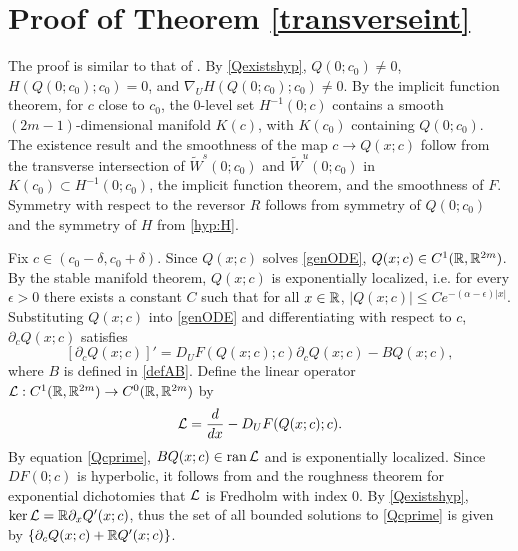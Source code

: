 \documentclass[10pt,reqno]{amsart}
\theoremstyle{plain}
\theoremstyle{definition}
\theoremstyle{remark}
\numberwithin{theorem}{section}
\numberwithin{equation}{section}
\begin{document}
\section{Proof of Theorem \ref{transverseint}}\label{sec:transverseintproof}

The proof is similar to that of \cite{Kapitula2020}. By \cref{Qexistshyp}, $Q(0; c_0) \neq 0$, $H(Q(0; c_0); c_0) = 0$, and $\nabla_U H(Q(0; c_0); c_0) \neq 0$. By the implicit function theorem, for $c$ close to $c_0$, the 0-level set $H^{-1}(0; c)$ contains a smooth $(2m-1)$-dimensional manifold $K(c)$, with $K(c_0)$ containing $Q(0; c_0)$. The existence result and the smoothness of the map $c \rightarrow Q(x; c)$ follow from the transverse intersection of $\tilde{W}^s(0; c_0)$ and $\tilde{W}^u(0; c_0)$ in $K(c_0) \subset H^{-1}(0; c_0)$, the implicit function theorem, and the smoothness of $F$. Symmetry with respect to the reversor $R$ follows from symmetry of $Q(0; c_0)$ and the symmetry of $H$ from \cref{hyp:H}.

Fix $c \in (c_0 - \delta, c_0 + \delta)$. Since $Q(x; c)$ solves \ref{genODE}, $Q(x; c) \in C^1(\mathbb{R}, \mathbb{R}^{2m})$. By the stable manifold theorem, $Q(x; c)$ is exponentially localized, i.e. for every $\epsilon > 0$ there exists a constant $C$ such that for all $x \in \mathbb{R}$, $|Q(x; c)| \leq C e^{-(\alpha - \epsilon)|x|}$. Substituting $Q(x; c)$ into \cref{genODE} and differentiating with respect to $c$, $\partial_c Q(x; c)$ satisfies
\begin{equation}\label{Qcprime}
[\partial_c Q(x; c)]' = D_U F(Q(x;c); c) \partial_c Q(x; c) - B Q(x;c),
\end{equation}
where $B$ is defined in \cref{defAB}. Define the linear operator $\mathcal{L}: C^1(\mathbb{R}, \mathbb{R}^{2m}) \rightarrow C^0(\mathbb{R}, \mathbb{R}^{2m})$ by
\begin{equation}\label{defLtv}
\mathcal{L} = \frac{d}{dx} - D_U F(Q(x;c); c).
\end{equation}
By equation \cref{Qcprime}, $B Q(x;c) \in \operatorname{ran} \mathcal{L}$ and is exponentially localized. Since $DF(0; c)$ is hyperbolic, it follows from \cite[Lemma~4.2]{Palmer1984} and the roughness theorem for exponential dichotomies \cite{Coppel1978} that $\mathcal{L}$ is Fredholm with index 0. By \cref{Qexistshyp}, $\mathop\mathrm{ker}\nolimits \mathcal{L} = \mathbb{R} \partial_x Q'(x; c)$, thus the set of all bounded solutions to \cref{Qcprime} is given by $\{\partial_c Q(x; c) + \mathbb{R} Q'(x; c)\}$.
\end{document}

